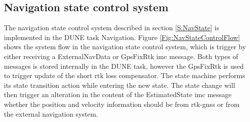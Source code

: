\subsection{Navigation state control system}
The navigation state control system described in section \ref{S:NavState} is implemented in the DUNE task Navigation. Figure \ref{Fig:NavStateControlFlow} shows the system flow in the navigation state control system, which is trigger by either receiving a ExternalNavData or GpsFixRtk \gls{imc} message. Both types of messages is stored internally in the DUNE task, however the GpsFixRtk is used to trigger update of the short rtk loss compensator. The state machine performs its state transition action while entering the new state. The state change will then trigger an alteration in the content of the EstimatedState \gls{imc} message whether the position and velocity information should be from \gls{rtk-gnss} or from the external navigation system.

